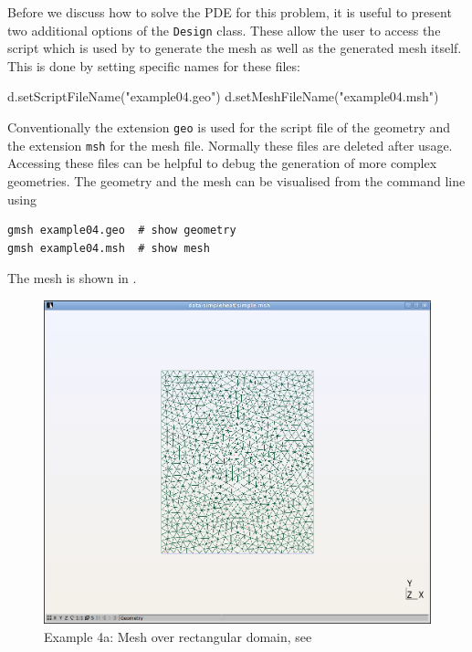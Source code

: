Before we discuss how to solve the PDE for this problem, it is useful to
present two additional options of the \verb|Design| class. 
These allow the user to access the script which is used by \gmsh to generate
the mesh as well as the generated mesh itself. This is done by setting specific
names for these files: 
\begin{python}
d.setScriptFileName("example04.geo")
d.setMeshFileName("example04.msh")
\end{python}
Conventionally the extension \texttt{geo} is used for the script file of the
\gmsh geometry and the extension \texttt{msh} for the mesh file. Normally these
files are deleted after usage.
Accessing these files can be helpful to debug the generation of more complex
geometries. The geometry and the mesh can be visualised from the command line
using
\begin{verbatim}
gmsh example04.geo  # show geometry
gmsh example04.msh  # show mesh
\end{verbatim}
The mesh is shown in .

\begin{figure}[ht]
\centerline{\includegraphics[width=4.in]{figures/simplemesh}}
\caption{Example 4a: Mesh over rectangular domain, see }
\label{fig:pycad rec mesh}
\end{figure}
\clearpage


